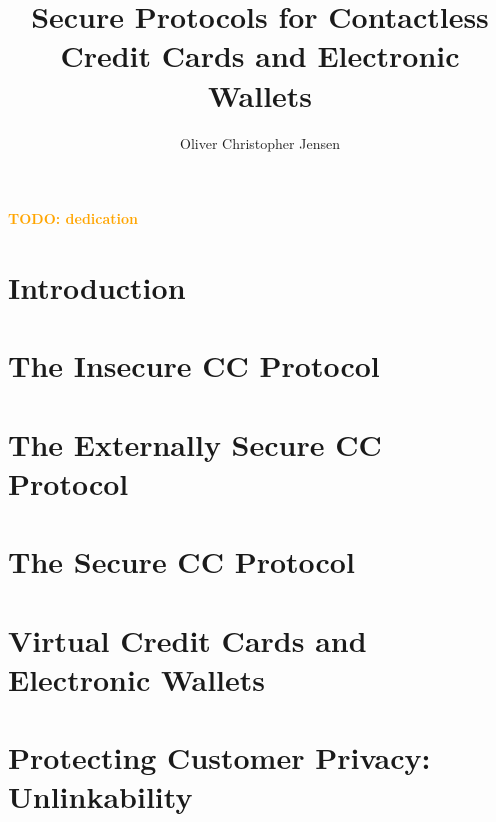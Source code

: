 \documentclass[12pt]{report}
\author{Oliver Christopher Jensen}
\title{Secure Protocols for Contactless Credit Cards and Electronic Wallets}
\newcommand{\todo}[1]{\textcolor{orange}{\large \bf TODO: #1}}
\begin{document}
\copyrightpage
\commcertpage
\titlepage

\begin{dedication}
%
\todo{dedication}
\end{dedication}

\begin{acknowledgments}		%
%

\end{acknowledgments}

\utabstract
{}
\indent


\tableofcontents
\listoffigures

\chapter{Introduction}
\label{cha:intro}





\chapter{The Insecure CC Protocol}
\label{cha:insecure}





\chapter{The Externally Secure CC Protocol}
\label{cha:external}




\chapter{The Secure CC Protocol}
\label{cha:secure}




\chapter{Virtual Credit Cards and Electronic Wallets}
\label{cha:electronic}


\chapter{Protecting Customer Privacy: Unlinkability}
\label{cha:unlinkability}



\end{document}
